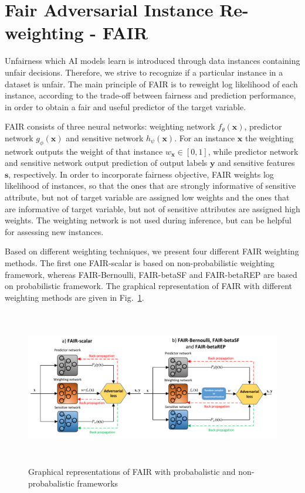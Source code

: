 \documentclass[preprint,12pt]{elsarticle}
\begin{document}
\section{Fair Adversarial Instance Re-weighting - FAIR}
\label{Sec:FAIR}
Unfairness which AI models learn is introduced through data instances containing unfair decisions. Therefore, we strive to recognize if a particular instance in a dataset is unfair. The main principle of FAIR is to reweight log likelihood of each instance, according to the trade-off between fairness and prediction performance, in order to obtain a fair and useful predictor of the target variable.

FAIR consists of three neural networks: weighting network $f_\theta(\mathbf{x})$, predictor network $g_\phi(\mathbf{x})$ and sensitive network $h_\psi(\mathbf{x})$.
For an instance $\mathbf{x}$ the weighting network outputs the weight of that instance $w_\mathbf{x}\in[0,1]$, while predictor network and sensitive network output prediction of output labels $\mathbf{y}$ and sensitive features $\mathbf{s}$, respectively. In order to incorporate fairness objective, FAIR weights log likelihood of instances, so that the ones that are strongly informative of sensitive attribute, but not of target variable are assigned low weights and the ones that are informative of target variable, but not of sensitive attributes are assigned high weights.
The weighting network is not used during inference, but can be helpful for assessing new instances.

Based on different weighting techniques, we present four different FAIR weighting methods. The first one FAIR-scalar is based on non-probabilistic weighting framework, whereas FAIR-Bernoulli, FAIR-betaSF and FAIR-betaREP are based on probabilistic framework. The graphical representation of FAIR with different weighting methods are given in Fig.~\ref{fig:Fig1}.

\begin{figure}[t!]
	\vskip 0.2in
	\center
	\includegraphics[angle=0, width=1\textwidth, height = 2.7in]{Fig1.pdf}
	\captionsetup{justification=centering}
	\caption{Graphical representations of FAIR with probabalistic and non-probabalistic frameworks}
	\label{fig:Fig1}
	\vskip -0.2in
\end{figure}
\end{document}
